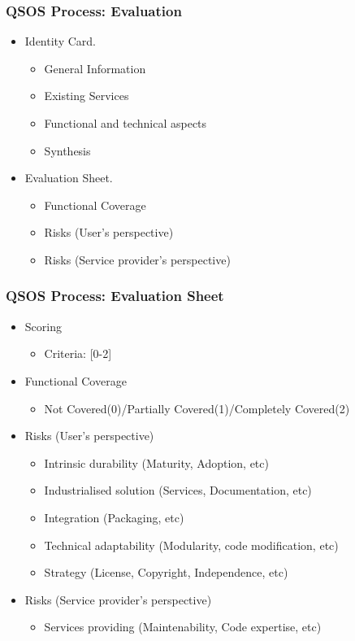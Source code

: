 \documentclass{beamer}
\begin{document}
\begin{frame}
 \frametitle{QSOS Process: Evaluation}
 \begin{itemize}
 \item Identity Card.
    \begin{itemize}
     \item General Information
     \item Existing Services
     \item Functional and technical aspects
     \item Synthesis
    \end{itemize}

 \item Evaluation Sheet.
    \begin{itemize}
     \item Functional Coverage
     \item Risks (User's perspective)
     \item Risks (Service provider's perspective)
    \end{itemize}

 \end{itemize}
\end{frame}


\begin{frame}
 \frametitle{QSOS Process: Evaluation Sheet}
 \begin{itemize}
 \item Scoring
    \begin{itemize}
     \item Criteria: [0-2]
    \end{itemize}

 \item Functional Coverage
    \begin{itemize}
     \item Not Covered(0)/Partially Covered(1)/Completely Covered(2)
    \end{itemize}
 \item Risks (User's perspective)
    \begin{itemize}
     \item Intrinsic durability (Maturity, Adoption, etc)
     \item Industrialised solution (Services, Documentation, etc)
     \item Integration (Packaging, etc)
     \item Technical adaptability (Modularity, code modification, etc)
     \item Strategy (License, Copyright, Independence, etc)
    \end{itemize}
 \item Risks (Service provider's perspective)
    \begin{itemize}
     \item Services providing (Maintenability, Code expertise, etc)
    \end{itemize}

 \end{itemize}
\end{frame}
\end{document}
